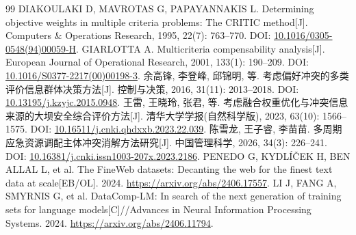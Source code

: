 \begin{thebibliography}{99}
 DIAKOULAKI D, MAVROTAS G, PAPAYANNAKIS L. Determining objective weights in multiple criteria problems: The CRITIC method[J]. Computers \& Operations Research, 1995, 22(7): 763--770. DOI: \href{https://doi.org/10.1016/0305-0548(94)00059-H}{10.1016/0305-0548(94)00059-H}.
 GIARLOTTA A. Multicriteria compensability analysis[J]. European Journal of Operational Research, 2001, 133(1): 190--209. DOI: \href{https://doi.org/10.1016/S0377-2217(00)00198-3}{10.1016/S0377-2217(00)00198-3}.
 余高锋, 李登峰, 邱锦明, 等. 考虑偏好冲突的多类评价信息群体决策方法[J]. 控制与决策, 2016, 31(11): 2013--2018. DOI: \href{https://doi.org/10.13195/j.kzyjc.2015.0948}{10.13195/j.kzyjc.2015.0948}.
 王雷, 王晓玲, 张君, 等. 考虑融合权重优化与冲突信息来源的大坝安全综合评价方法[J]. 清华大学学报(自然科学版), 2023, 63(10): 1566--1575. DOI: \href{https://doi.org/10.16511/j.cnki.qhdxxb.2023.22.039}{10.16511/j.cnki.qhdxxb.2023.22.039}.
 陈雪龙, 王子睿, 李苗苗. 多周期应急资源调配主体冲突消解方法研究[J]. 中国管理科学, 2026, 34(3): 226--241. DOI: \href{https://doi.org/10.16381/j.cnki.issn1003-207x.2023.2186}{10.16381/j.cnki.issn1003-207x.2023.2186}.
 PENEDO G, KYDLÍČEK H, BEN ALLAL L, et al. The FineWeb datasets: Decanting the web for the finest text data at scale[EB/OL]. 2024. \url{https://arxiv.org/abs/2406.17557}.
 LI J, FANG A, SMYRNIS G, et al. DataComp-LM: In search of the next generation of training sets for language models[C]//Advances in Neural Information Processing Systems. 2024. \url{https://arxiv.org/abs/2406.11794}.
\end{thebibliography}
